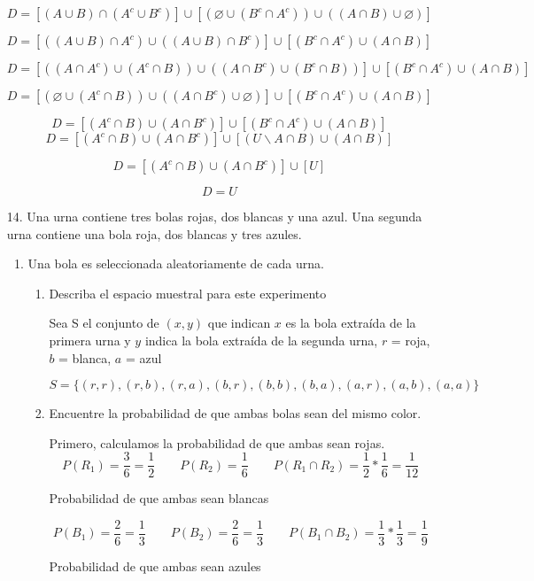 \documentclass[letterpaper,11pt]{article}
\renewcommand{%
	\contentsname}{\vspace{-1cm} \hfill\bfseries\LARGE Índice \hfill \vspace{0.2cm}%
}
\begin{document}
\begin{enumerate}
$$
D= [(A \cup B) \cap (A^c \cup B^c)] \cup [( \varnothing  \cup (B^c \cap A^c) ) \cup 
((A \cap B) \cup \varnothing )]
$$

$$
D= [((A \cup B) \cap A^c) \cup ((A \cup B) \cap B^c) ] \cup [ (B^c \cap A^c) \cup 
(A \cap B)]
$$

$$
D= [((A \cap A^c) \cup (A^c \cap B)) \cup ((A \cap B^c) \cup (B^c \cap B)) ] \cup [ (B^c \cap A^c) \cup (A \cap B)]
$$

$$
D= [(\varnothing \cup (A^c \cap B)) \cup ((A \cap B^c) \cup \varnothing) ] \cup [ (B^c \cap A^c) \cup (A \cap B)]
$$

$$
D= [(A^c \cap B) \cup (A \cap B^c) ] \cup [ (B^c \cap A^c) \cup (A \cap B)]
$$
%
$$
D= [(A^c \cap B) \cup (A \cap B^c) ] \cup [(U\backslash A\cap B) \cup (A \cap B)]
$$

$$
D= [(A^c \cap B) \cup (A \cap B^c) ] \cup [U]
$$

$$
D= U
$$

\item[14.] Una urna contiene tres bolas rojas, dos blancas y una azul. Una segunda urna contiene una bola roja, dos blancas y tres azules. 

\begin{enumerate}
	\item Una bola es seleccionada aleatoriamente de cada urna.
	\begin{enumerate}
		\item Describa el espacio muestral para este experimento
		
		Sea S el conjunto de $(x,y)$ que indican $x$ es la bola extraída de la primera urna y $y$ indica la bola extraída de la segunda urna, $r$ = roja, $b$ = blanca, $a$ = azul

		$$
		S=\{ (r,r), (r,b), (r,a), (b,r), (b,b), (b,a), (a,r), (a,b), (a,a) \}
		$$

		\item Encuentre la probabilidad de que ambas bolas sean del mismo color.
		
		Primero, calculamos la probabilidad de que ambas sean rojas. 
		$$P(R_1)= \frac{3}{6} = \frac{1}{2} \qquad P(R_2) = \frac{1}{6} \qquad P(R_1 \cap R_2)= \frac{1}{2} * \frac{1}{6} = \frac{1}{12} $$

		Probabilidad de que ambas sean blancas

		$$P(B_1)= \frac{2}{6} = \frac{1}{3} \qquad P(B_2) = \frac{2}{6}= \frac{1}{3} \qquad P(B_1 \cap B_2)= \frac{1}{3} * \frac{1}{3} = \frac{1}{9} $$

		Probabilidad de que ambas sean azules


\end{enumerate}
\end{enumerate}
\end{enumerate}
\end{document}
